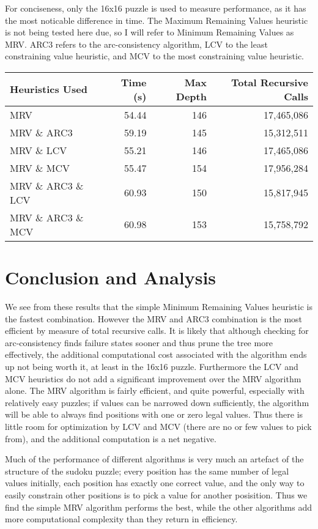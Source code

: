 \documentclass{article}
\begin{document}
For conciseness, only the 16x16 puzzle is used to measure performance, as it has
the most noticable difference in time. The Maximum Remaining Values heuristic
is not being tested here due, so I will refer to Minimum Remaining Values as MRV.
ARC3 refers to the arc-consistency algorithm, LCV to the least constraining 
value heuristic, and MCV to the most constraining value heuristic. \bigskip

\begin{tabular}{l | r | r | r }
Heuristics Used  & Time (s) & Max Depth & Total Recursive Calls \\ \hline
MRV                    & 54.44 & 146 & 17,465,086 \\
MRV \&{} ARC3          & 59.19 & 145 & 15,312,511 \\
MRV \&{} LCV           & 55.21 & 146 & 17,465,086 \\
MRV \&{} MCV           & 55.47 & 154 & 17,956,284 \\
MRV \&{} ARC3 \&{} LCV & 60.93 & 150 & 15,817,945 \\
MRV \&{} ARC3 \&{} MCV & 60.98 & 153 & 15,758,792 \\
\end {tabular}

\section{Conclusion and Analysis}
We see from these results that the simple Minimum Remaining Values heuristic
is the fastest combination. However the MRV and ARC3 combination is the most
efficient by measure of total recursive calls.
It is likely that although checking for arc-consistency finds failure states
sooner and thus prune the tree more effectively, the additional computational
cost associated with the algorithm ends up not being worth it, at least in
the 16x16 puzzle. Furthermore the LCV and MCV heuristics do not add a 
significant improvement over the MRV algorithm alone. 
The MRV algorithm is fairly efficient, and quite powerful, especially with
relatively easy puzzles; if values can be narrowed down sufficiently, the
algorithm will be able to always find positions with one or zero legal values.
Thus there is little room for optimization by LCV and MCV (there are no or few
values to pick from), and the additional computation is a net negative.

Much of the performance of different algorithms is very much an artefact
of the structure of the sudoku puzzle; every position has the same number
of legal values initially, each position has exactly one correct value, and
the only way to easily constrain other positions is to pick a value for another
posisition. Thus we find the simple MRV algorithm performs the best, while the
other algorithms add more computational complexity than they return in 
efficiency.
\end{document}
